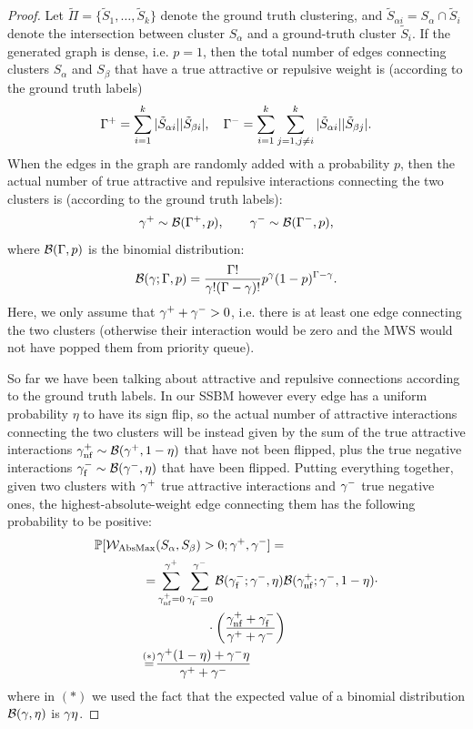 \begin{proof}
Let $\tilde{\Pi}=\{\tilde{S}_1,\ldots,\tilde{S}_k\}$ denote the ground truth clustering, and $\tilde{S}_{\alpha i}=S_\alpha\cap \tilde{S}_i$ denote the intersection between cluster $S_{\alpha}$ and a ground-truth cluster $\tilde{S}_i$.
If the generated graph is dense, i.e. $p=1$, then the total number of edges connecting clusters $S_{\alpha}$ and $S_{\beta}$ that have a true attractive or repulsive weight is (according to the ground truth labels)
\begin{equation}
\Gamma^+=\sum_{i=1}^k |\tilde{S}_{\alpha i}||\tilde{S}_{\beta i}|, \quad \Gamma^-=\sum_{i=1}^k \sum_{j=1,j\neq i}^k |\tilde{S}_{\alpha i}||\tilde{S}_{\beta j}|.
\end{equation}
When the edges in the graph are randomly added with a probability $p$, then the actual number of true attractive and repulsive interactions connecting the two clusters is (according to the ground truth labels):
\begin{equation}
\gamma^+ \sim \mathcal{B}(\Gamma^+,p), \qquad \gamma^- \sim \mathcal{B}(\Gamma^-,p), 
\end{equation}
where $\mathcal{B}(\Gamma,p)$ is the binomial distribution:
\begin{equation}
\mathcal{B}(\gamma;\Gamma,p) = \frac{\Gamma !}{\gamma! (\Gamma-\gamma)!} p^\gamma (1-p)^{\Gamma-\gamma}.
\end{equation}
Here, we only assume that $\gamma^+ + \gamma^- >0$, i.e. there is at least one edge connecting the two clusters (otherwise their interaction would be zero and the MWS would not have popped them from priority queue). 

So far we have been talking about attractive and repulsive connections according to the ground truth labels. In our SSBM however every edge has a uniform probability $\eta$ to have its sign flip, so  the actual number of attractive interactions connecting the two clusters will be instead given by the sum of the true attractive interactions $\gamma^+_{\mathrm{nf}}\sim \mathcal{B}(\gamma^+,1-\eta)$ that have not been flipped, plus the true negative interactions $\gamma^-_{\mathrm{f}}\sim \mathcal{B}(\gamma^-,\eta)$ that have been flipped.
Putting everything together, given two clusters with $\gamma^+$ true attractive interactions and $\gamma^-$ true negative ones, the highest-absolute-weight edge connecting them has the following probability to be positive:
\begin{align}\label{eq:mws_prob}
 \mathbb{P}[\mathcal{W}_{\mathrm{AbsMax}}&(S_\alpha,S_\beta)>0;\gamma^+,\gamma^-] = \nonumber \\
=&\sum_{\gamma^+_{\mathrm{nf}}=0}^{\gamma^+}\sum_{\gamma^-_{\mathrm{f}}=0}^{\gamma^-} 
\mathcal{B}(\gamma^-_{\mathrm{f}};\gamma^-,\eta) \mathcal{B}(\gamma^+_{\mathrm{nf}};\gamma^-,1-\eta)\cdot  \nonumber\\
& \qquad \qquad  \cdot \left(\frac{\gamma^+_{\mathrm{nf}}+\gamma^-_{\mathrm{f}}}{\gamma^+ + \gamma^-} \right) \nonumber\\
\stackrel{(*)}{=}&\frac{\gamma^+(1-\eta)+\gamma^-\eta}{\gamma^+ + \gamma^-}
\end{align}  
where in $(*)$ we used the fact that the expected value of a binomial distribution $\mathcal{B}(\gamma,\eta)$ is $\gamma \eta$.


\end{proof}

